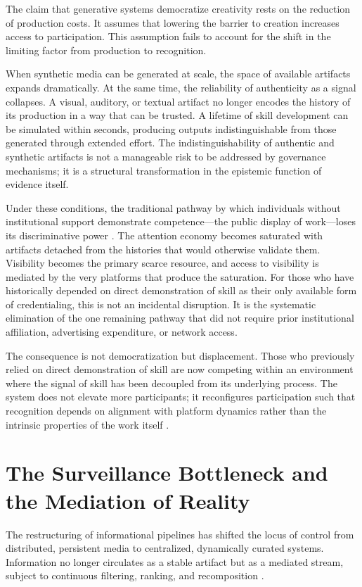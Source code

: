 \documentclass[12pt, a4paper]{article}
\begin{document}
The claim that generative systems democratize creativity rests on the reduction of production costs. It assumes that lowering the barrier to creation increases access to participation. This assumption fails to account for the shift in the limiting factor from production to recognition.

When synthetic media can be generated at scale, the space of available artifacts expands dramatically. At the same time, the reliability of authenticity as a signal collapses. A visual, auditory, or textual artifact no longer encodes the history of its production in a way that can be trusted. A lifetime of skill development can be simulated within seconds, producing outputs indistinguishable from those generated through extended effort. The indistinguishability of authentic and synthetic artifacts is not a manageable risk to be addressed by governance mechanisms; it is a structural transformation in the epistemic function of evidence itself.

Under these conditions, the traditional pathway by which individuals without institutional support demonstrate competence---the public display of work---loses its discriminative power \cite{Zuboff2019}. The attention economy becomes saturated with artifacts detached from the histories that would otherwise validate them. Visibility becomes the primary scarce resource, and access to visibility is mediated by the very platforms that produce the saturation. For those who have historically depended on direct demonstration of skill as their only available form of credentialing, this is not an incidental disruption. It is the systematic elimination of the one remaining pathway that did not require prior institutional affiliation, advertising expenditure, or network access.

The consequence is not democratization but displacement. Those who previously relied on direct demonstration of skill are now competing within an environment where the signal of skill has been decoupled from its underlying process. The system does not elevate more participants; it reconfigures participation such that recognition depends on alignment with platform dynamics rather than the intrinsic properties of the work itself \cite{Goodhart1975}.

\section{The Surveillance Bottleneck and the Mediation of Reality}

The restructuring of informational pipelines has shifted the locus of control from distributed, persistent media to centralized, dynamically curated systems. Information no longer circulates as a stable artifact but as a mediated stream, subject to continuous filtering, ranking, and recomposition \cite{Zuboff2019}.
\end{document}
